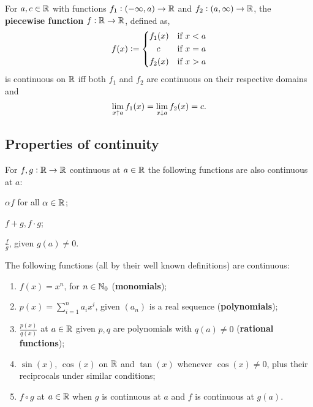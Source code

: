 \documentclass[../Year1.tex]{subfiles}
\begin{document}
\begin{theorem}
    For $a,c\in\mathbb{R}$ with functions $f_1:(-\infty,a)\rightarrow\mathbb{R}$ and $f_2:(a,\infty)\rightarrow\mathbb{R}$, the \textbf{piecewise function} $f:\mathbb{R}\rightarrow\mathbb{R}$, defined as, \[
        f(x) := \begin{dcases}
            f_1(x) & \text{\textcolor{black}{if }} x<a \\
            \ \hfil c\hfil & \text{\textcolor{black}{if }} x=a \\
            f_2(x) & \text{\textcolor{black}{if }} x>a \\
        \end{dcases}
    \] is continuous on $\mathbb{R}$ iff both $f_1$ and $f_2$ are continuous on their respective domains and 
    \begingroup\belowdisplayskip=-15pt
    \[
    \lim_{x\uparrow a}f_1(x) = \lim_{x\downarrow a}f_2(x) = c
    \textcolor{black}{.}
    \]
    \endgroup
\end{theorem}

\subsection{Properties of continuity}

\begin{theorem}
    For $f,g:\mathbb{R}\rightarrow\mathbb{R}$ continuous at $a\in\mathbb{R}$ the following functions are also continuous at $a$: \\ \begin{enumerate*}
        \item $\alpha f$ for all $\alpha\in\mathbb{R}$; \hspace{100pt}
        \item $f+g, f \cdot g$; \hspace{100pt}
        \item $\displaystyle\frac{f}{g}$, given $g(a)\neq0$.
    \end{enumerate*}
\end{theorem}

\begin{samepage}
\begin{theorem}
    The following functions (all by their well known definitions) are continuous: \begin{enumerate}
        \item $f(x)=x^n$, for $n\in\mathbb{N}_0$ (\textbf{monomials});
        \item $\displaystyle p(x)=\sum_{i=1}^na_ix^i$, given $(a_n)$ is a real sequence (\textbf{polynomials});
        \vspace{-10pt}
        \item $\displaystyle \frac{p(x)}{q(x)}$  at $a\in\mathbb{R}$ given $p,q$ are polynomials with $q(a)\neq 0$ (\textbf{rational functions});
        \item $\sin(x)$, $\cos(x)$ on $\mathbb{R}$ and $\tan(x)$ whenever $\cos(x)\neq0$, plus their reciprocals under similar conditions;
        \item $f\circ g$ at $a\in\mathbb{R}$ when $g$ is continuous at $a$ and $f$ is continuous at $g(a)$.
        \end{enumerate}
\end{theorem}
\end{samepage}
\end{document}
